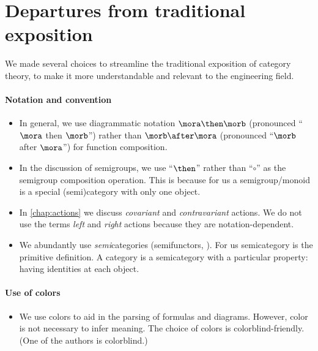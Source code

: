 
\section[Departures from tradition]{Departures from traditional exposition}


We made several choices to streamline the traditional exposition of category theory, to make it more understandable and relevant to the engineering field.

\paragraph{Notation and convention}
\begin{itemize}
    \item In general, we use diagrammatic notation $\mora \then \morb$ (pronounced ``$\mora$ then  $\morb$'') rather than $\morb \after \mora$ (pronounced ``$\morb$ after $\mora$'') for function composition.
    \item In the discussion of semigroups, we use ``$\then$'' rather than ``$\circ$'' as the semigroup composition operation.
          This is because for us a semigroup/monoid is a special (semi)category with only one object.
    \item In \cref{chap:actions} we discuss \emph{covariant} and \emph{contravariant} actions.
          We do not use the terms \emph{left} and \emph{right} actions because they are notation-dependent.
    \item We abundantly use \emph{semi}categories (semifunctors, \etc).
          For us semicategory is the primitive definition.
          A category is a semicategory with a particular property: having identities at each object.
\end{itemize}

\paragraph{Use of colors}
\begin{itemize}
    \item We use colors to aid in the parsing of formulas and diagrams.
          However, color is not necessary to infer meaning.
          The choice of colors is colorblind-friendly.
          (One of the authors is colorblind.)
\end{itemize}

